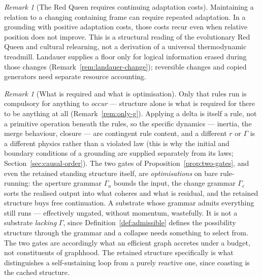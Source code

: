 \documentclass[11pt,a4paper]{article}
\theoremstyle{remark}\newtheorem{remark}[definition]{Remark}
\begin{document}
\begin{remark}[The Red Queen requires continuing adaptation costs]\label{rem:red-queen}
Maintaining a relation to a changing containing frame can require repeated
adaptation. In a grounding with positive adaptation costs, those costs recur
even when relative position does not improve. This is a structural reading of
the evolutionary Red Queen and cultural relearning, not a derivation of a
universal thermodynamic treadmill. Landauer supplies a floor only for logical
information erased during those changes (Remark~\ref{rem:landauer-change});
reversible changes and copied generators need separate resource accounting.
\end{remark}

\begin{remark}[What is required and what is optimisation]\label{rem:nothing-compulsory}
Only that rules run is compulsory for anything to \emph{occur} --- structure alone is what is required for there to be anything at all (Remark~\ref{rem:only-g}). Applying a delta is itself a rule, not a primitive operation beneath the rules, so the specific dynamics --- inertia, the merge behaviour, closure --- are contingent rule content, and a different $r$ or $\Gamma$ is a different physics rather than a violated law (this is why the initial and boundary conditions of a grounding are supplied separately from its laws; Section~\ref{sec:causal-order}). The two gates of Proposition~\ref{prop:two-gates}, and even the retained standing structure itself, are \emph{optimisations} on bare rule-running: the aperture grammar $\Gamma_a$ bounds the input, the change grammar $\Gamma_c$ sorts the realised output into what coheres and what is residual, and the retained structure buys free continuation. A substrate whose grammar admits everything still runs --- effectively ungated, without momentum, wastefully. It is not a substrate \emph{lacking} $\Gamma$, since Definition~\ref{def:admissible} defines the possibility structure through the grammar and a collapse needs something to select from. The two gates are accordingly what an efficient graph accretes under a budget, not constituents of graphhood. The retained structure specifically is what distinguishes a self-sustaining loop from a purely reactive one, since coasting is the cached structure.
\end{remark}
\end{document}
